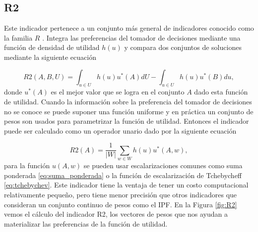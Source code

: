 
\subsection{R2} \label{sec:R2}
Este indicador pertenece a un conjunto más general de indicadores conocido como la familia $R$ \cite{R2}. Integra las preferencias del tomador de decisiones mediante una función de densidad de utilidad $h(u)$ y compara dos conjuntos de soluciones mediante la siguiente ecuación

\begin{equation} 
    R2(A,B,U)=\int_{u\in U} h(u)u^*(A) dU- \int_{u\in U} h(u) u^*(B)du, \nonumber
\end{equation}
donde  $u^*(A)$ es el mejor valor que se logra en el conjunto $A$ dado esta función de utilidad. Cuando la información sobre la preferencia del tomador de decisiones no se conoce se puede suponer una función uniforme y en práctica un conjunto de pesos son usados para parametrizar la función de utilidad. Entonces el indicador puede ser calculado como un operador unario dado por la siguiente ecuación

\begin{equation} \label{eq:R2}
    R2(A)=\frac{1}{|W|}\sum_{w\in W} h(u)u^*(A,w), \nonumber
\end{equation}
para la función $u(A,w)$ se pueden usar escalarizaciones comunes como suma ponderada \eqref{eq:suma_ponderada} o la función de escalarización de Tchebycheff \eqref{eq:tchebychev}. Este indicador tiene la ventaja de tener un costo computacional relativamente pequeño, pero tiene menor precisión que otros indicadores que consideran un conjunto continuo de pesos como el IPF. En la Figura \ref{fig:R2} vemos el cálculo del indicador R2, los vectores de pesos que nos ayudan a materializar las preferencias de la función de utilidad.

